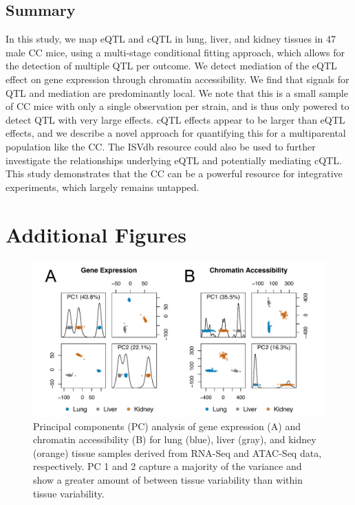 \subsection{Summary}

In this study, we map eQTL and cQTL in lung, liver, and kidney tissues in 47 male CC mice, using a multi-stage conditional fitting approach, which allows for the detection of multiple QTL per outcome. We detect mediation of the eQTL effect on gene expression through chromatin accessibility. We find that signals for QTL and mediation are predominantly local. We note that this is a small sample of CC mice with only a single observation per strain, and is thus only powered to detect QTL with very large effects. cQTL effects appear to be larger than eQTL effects, and we describe a novel approach for quantifying this for a multiparental population like the CC. The ISVdb resource could also be used to further investigate the relationships underlying eQTL and potentially mediating cQTL. This study demonstrates that the CC can be a powerful resource for integrative experiments, which largely remains untapped.

\newpage

\section{Additional Figures}

\begin{figure}[h!]
\renewcommand{\familydefault}{\sfdefault}\normalfont
\centering
\includegraphics[width=\textwidth, trim={0in 0in 0in 0in}, clip]{figures/6-mediation/pca_processed.pdf}
\caption[Principal components of gene expression and chromatin accessibility]{Principal components (PC) analysis of gene expression (A) and chromatin accessibility (B) for lung (blue), liver (gray), and kidney (orange) tissue samples derived from RNA-Seq and ATAC-Seq data, respectively. PC 1 and 2 capture a majority of the variance and show a greater amount of between tissue variability than within tissue variability. \label{fig:pca_plots}}
\end{figure}





